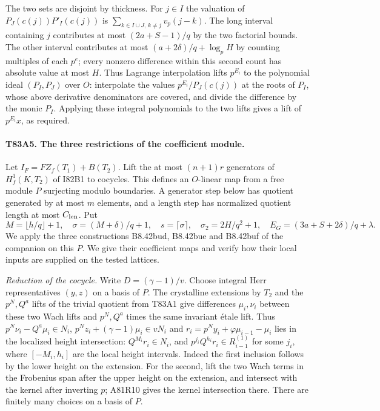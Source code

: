 The two sets are disjoint by thickness. For $j\in I$ the valuation
of $P_J(c(j))P'_I(c(j))$ is $\sum_{k\in I\cup J,\,k\ne j}
v_p(j-k)$. The long interval containing $j$ contributes at most
$(2a+S-1)/q$ by the two factorial bounds. The other interval
contributes at most $(a+2\delta)/q+\log_p H$ by counting
multiples of each $p^e$; every nonzero difference within this
second count has absolute value at most $H$. Thus Lagrange
interpolation lifts $p^{E_i}$ to the polynomial ideal $(P_I,P_J)$
over $O$: interpolate the values $p^{E_i}/P_J(c(j))$ at the
roots of $P_I$, whose above derivative denominators are covered,
and divide the difference by the monic $P_I$. Applying these
integral polynomials to the two lifts gives a lift of $p^{E_i}x$,
as required.

\paragraph{T83A5. The three restrictions of the coefficient module.}
Let $I_F=FZ_f(T_1)+B(T_2)$. Lift the at most $(n+1)r$ generators
of $H_f^1(K,T_2)$ of I82B1 to cocycles. This defines an
$O$-linear map from a free module $P$ surjecting modulo boundaries.
A generator step below has quotient generated by at most $m$
elements, and a length step has normalized quotient length at most
$C_{\rm len}$. Put
\[
 M=\lfloor h/q\rfloor+1,\quad
 \sigma=(M+\delta)/q+1,\quad s=\lceil\sigma\rceil,\quad
 \sigma_2=2H/q^2+1,\quad
 E_G=(3a+S+2\delta)/q+\lambda.
\]
We apply the three constructions B8.42bud, B8.42bue and B8.42buf
of the companion on this $P$. We give their coefficient maps and
verify how their local inputs are supplied on the tested lattices.

\emph{Reduction of the cocycle.}
Write $D=(\gamma-1)/v$. Choose integral Herr representatives
$(y,z)$ on a basis of $P$. The crystalline extensions by $T_2$
and the $p^N,Q^a$ lifts of the trivial quotient from T83A1 give
differences $\mu_i,\nu_i$ between these two Wach lifts and
$p^N,Q^a$ times the same invariant \'etale lift. Thus
$p^N\nu_i-Q^a\mu_i\in N_i$,
$p^Nz_i+(\gamma-1)\mu_i\in vN_i$ and
$r_i=p^Ny_i+\varphi\mu_{i-1}-\mu_i$ lies in the localized
height intersection: $Q^{M_i}r_i\in N_i$, and
$p^{j_i}Q^{h_i}r_i\in R_{i-1}^{(1)}$ for some $j_i$,
where $[-M_i,h_i]$ are the local height intervals. Indeed the
first inclusion follows by the lower height on the extension.
For the second, lift the two Wach terms in the Frobenius span after
the upper height on the extension, and intersect with the kernel
after inverting $p$; A81R10 gives the kernel intersection there.
There are finitely many choices on a basis of $P$.

